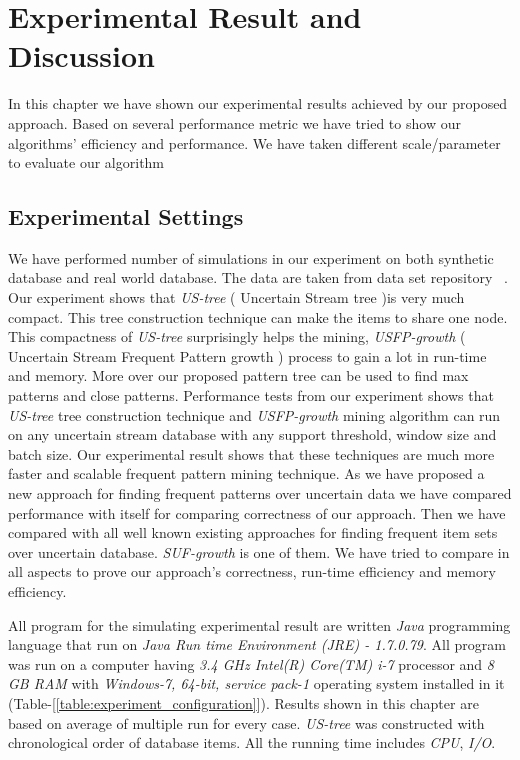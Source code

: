 %
\chapter{Experimental Result and Discussion}
In this chapter we have shown our experimental results achieved by our proposed approach. Based on several performance metric we have tried to show our algorithms' efficiency and performance. We have taken different scale/parameter to evaluate our algorithm


\section{Experimental Settings}
We have performed number of simulations in our experiment on both synthetic database and real world database. The data are taken from data set repository ~\cite{dataset}. Our experiment shows that \emph{US-tree} ( Uncertain Stream tree )is very much compact. This tree construction technique can make the items to share one node. This compactness of \emph{US-tree} surprisingly helps the mining, \emph{USFP-growth} ( Uncertain Stream Frequent Pattern growth ) process to gain a lot in run-time and memory. More over our proposed pattern tree can be used to find max patterns and close patterns. Performance tests from our experiment shows that \emph{US-tree} tree construction technique and \emph{USFP-growth} mining algorithm can run on any uncertain stream database with any support threshold, window size and batch size. Our experimental result shows that these techniques are much more faster and scalable frequent pattern mining technique. As we have proposed a new approach for finding frequent patterns over uncertain data we have compared performance with itself for comparing correctness of our approach. Then we have compared with all well known existing approaches for finding frequent item sets over uncertain database. \emph{SUF-growth} is one of them. We have tried to compare in all aspects to prove our approach's correctness, run-time efficiency and memory efficiency.

All program for the simulating experimental result are written \emph{Java} programming language that run on \emph{Java Run time Environment (JRE) - 1.7.0.79}. All program was run on a computer having \emph{3.4 GHz Intel(R) Core(TM) i-7} processor and \emph{8 GB RAM} with \emph{Windows-7, 64-bit, service pack-1} operating system installed in it (Table-[\ref{table:experiment_configuration}]). Results shown in this chapter are based on average of multiple run for every case. \emph{US-tree} was constructed with chronological order of database items. All the running time includes \emph{CPU}, \emph{I/O}.\\
